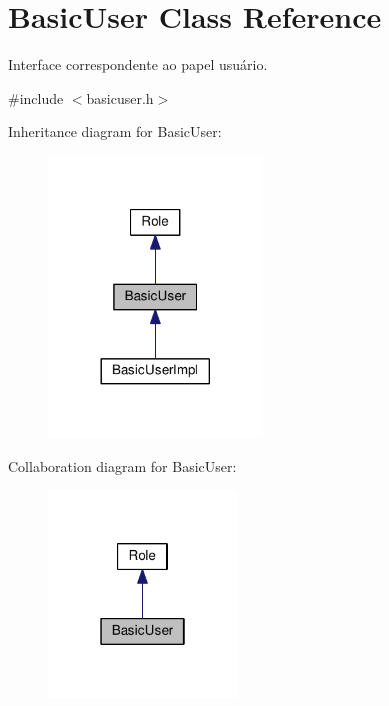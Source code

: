 \hypertarget{classBasicUser}{}\section{Basic\+User Class Reference}
\label{classBasicUser}


Interface correspondente ao papel usuário.  




{\ttfamily \#include $<$basicuser.\+h$>$}



Inheritance diagram for Basic\+User\+:
\nopagebreak
\begin{figure}[H]
\begin{center}
\leavevmode
\includegraphics[width=161pt]{d5/d46/classBasicUser__inherit__graph}
\end{center}
\end{figure}


Collaboration diagram for Basic\+User\+:
\nopagebreak
\begin{figure}[H]
\begin{center}
\leavevmode
\includegraphics[width=142pt]{de/d6b/classBasicUser__coll__graph}
\end{center}
\end{figure}
